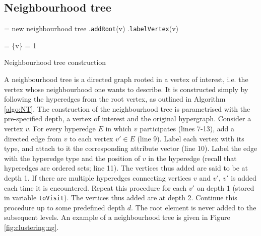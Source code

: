 \subsection{Neighbourhood tree}
\label{sec:NT}



\begin{algorithm}[t]
\SetAlgoLined
{}
 \NT = new neighbourhood tree\; 
 \NT.\texttt{addRoot}(v)\;
 \NT.\texttt{labelVertex}(v) 
 
 \Tovisit = \{v\} 
 \D = 1 
 
 \caption{Neighbourhood tree construction}
 \label{algo:NT}
\end{algorithm}


A neighbourhood tree is a directed graph rooted in a vertex of interest, i.e. the vertex whose neighbourhood one wants to describe.
It is constructed simply by following the hyperedges from the root vertex, as outlined in Algorithm \ref{algo:NT}.
The construction of the neighbourhood tree is parametrised with the pre-specified depth, a vertex of interest and the original hypergraph. 
Consider a vertex $v$.    
For every hyperedge $E$ in which $v$ participates (lines 7-13), add a directed edge from $v$ to each vertex $v' \in E$ (line 9).
Label each vertex with its type, and attach to it the corresponding attribute vector (line 10). 
Label the edge with the hyperedge type and the position of $v$ in the hyperedge (recall that hyperedges are ordered sets; line 11). 
The vertices thus added are said to be at depth 1.  
If there are multiple hyperedges connecting vertices $v$ and $v'$, $v'$ is added each time it is encountered.
Repeat this procedure for each $v'$ on depth 1 (stored in variable \texttt{toVisit}).
The vertices thus added are at depth 2.
Continue this procedure up to some predefined depth $d$.   
The root element is never added to the subsequent levels.
An example of a neighbourhood tree is given in Figure \ref{fig:clustering:ng}.


